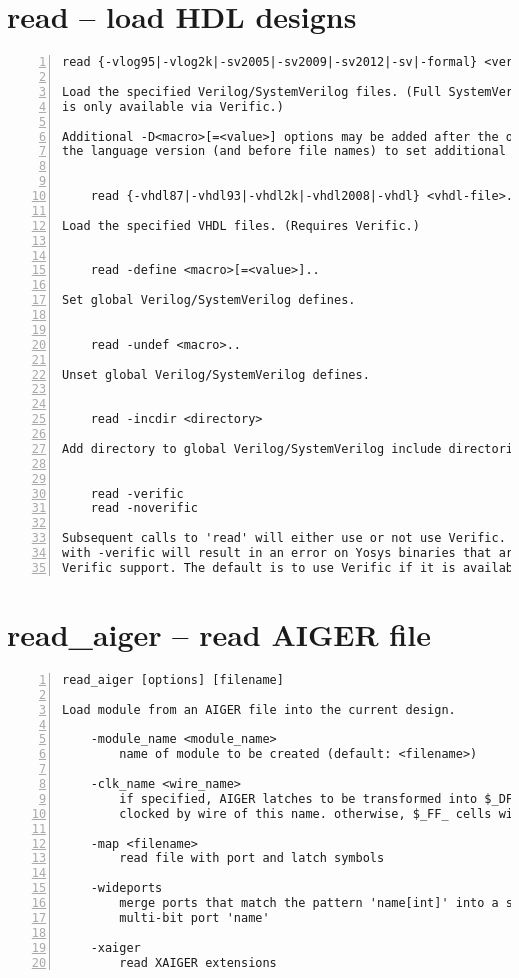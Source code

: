 \section{read -- load HDL designs}
\label{cmd:read}
\begin{lstlisting}[numbers=left,frame=single]
    read {-vlog95|-vlog2k|-sv2005|-sv2009|-sv2012|-sv|-formal} <verilog-file>..

Load the specified Verilog/SystemVerilog files. (Full SystemVerilog support
is only available via Verific.)

Additional -D<macro>[=<value>] options may be added after the option indicating
the language version (and before file names) to set additional verilog defines.


    read {-vhdl87|-vhdl93|-vhdl2k|-vhdl2008|-vhdl} <vhdl-file>..

Load the specified VHDL files. (Requires Verific.)


    read -define <macro>[=<value>]..

Set global Verilog/SystemVerilog defines.


    read -undef <macro>..

Unset global Verilog/SystemVerilog defines.


    read -incdir <directory>

Add directory to global Verilog/SystemVerilog include directories.


    read -verific
    read -noverific

Subsequent calls to 'read' will either use or not use Verific. Calling 'read'
with -verific will result in an error on Yosys binaries that are built without
Verific support. The default is to use Verific if it is available.
\end{lstlisting}

\section{read\_aiger -- read AIGER file}
\label{cmd:read_aiger}
\begin{lstlisting}[numbers=left,frame=single]
    read_aiger [options] [filename]

Load module from an AIGER file into the current design.

    -module_name <module_name>
        name of module to be created (default: <filename>)

    -clk_name <wire_name>
        if specified, AIGER latches to be transformed into $_DFF_P_ cells
        clocked by wire of this name. otherwise, $_FF_ cells will be used

    -map <filename>
        read file with port and latch symbols

    -wideports
        merge ports that match the pattern 'name[int]' into a single
        multi-bit port 'name'

    -xaiger
        read XAIGER extensions
\end{lstlisting}

